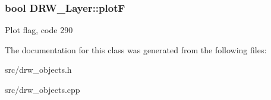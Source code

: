 \subsubsection[{plot\+F}]{\setlength{\rightskip}{0pt plus 5cm}bool D\+R\+W\+\_\+\+Layer\+::plot\+F}\label{class_d_r_w___layer_ac385c41055cb96d3c0ccb2938cb198f9}
Plot flag, code 290 

The documentation for this class was generated from the following files\+:\begin{DoxyCompactItemize}
\item 
src/drw\+\_\+objects.\+h\item 
src/drw\+\_\+objects.\+cpp\end{DoxyCompactItemize}

